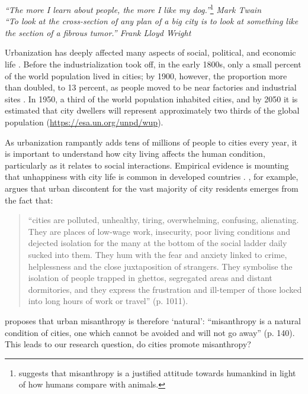 \documentclass[11pt, letterpaper]{article}
\newcommand{\emd}[1]{\ExecuteMetaData[/tmp/tex]{#1}} %
\begin{document}
\begin{spacing}{1.4} %
\vspace{.25in}

{\small\it \noindent ``The more I learn about people, the more I like my dog.''}\footnote{\citet{cooper2018animals} suggests that misanthropy is a justified attitude towards humankind in light of how humans %
    compare with animals.} {\small\it Mark Twain}\\[0.3em]

{\small\it \noindent ``To look at the
 cross-section of any plan of a big city is to look at something like the
 section of a fibrous tumor.'' Frank Lloyd Wright\\}


Urbanization has deeply affected many aspects of social, political, and economic life \citep{kleniewski2010cities}. 
Before the industrialization took off, in the early 1800s, only a small percent of the world population lived in cities; by 1900, however, the proportion more than doubled, to 13 percent, as people moved to be near factories and industrial sites
\citep{davis55}. In 1950, a third of the world population inhabited cities, and by 2050 it is estimated that city dwellers will represent approximately two thirds of the global population (\url{https://esa.un.org/unpd/wup}). 
 
As urbanization rampantly adds tens of millions of people to cities every year,
it is important to understand how city living affects the human condition,
particularly as it relates to social interactions. Empirical evidence is mounting that unhappiness with city life is common in developed countries \citep{aokCityBook15,sorensen14,morrison17,ala18,aok20}. \citet[]{amin06}, for example, argues that urban discontent for the vast majority of city residents emerges from the fact that:
\begin{quote}  ``cities are polluted,
  unhealthy, tiring, overwhelming, confusing, alienating. They are places of low-wage work, insecurity, poor living conditions and dejected isolation for the many at the bottom of the social ladder daily sucked into them. They hum with the fear and anxiety linked to crime, helplessness and the close juxtaposition of strangers. They symbolise the isolation of people trapped in ghettos, segregated areas and distant dormitories, and they express the frustration and ill-temper of those locked into long hours of work or travel'' (p. 1011).\end{quote}
 \citet[]{thrift05} proposes that urban misanthropy is therefore `natural': ``misanthropy is a natural condition of cities, one which cannot be avoided and will not go away'' (p. 140). This leads to our research question, do cities promote misanthropy?
  

\end{spacing}
\end{document}
